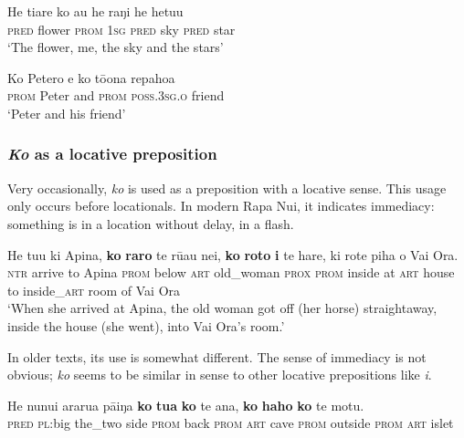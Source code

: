 \ea\label{ex:4.322}
\gll He tiare ko au he raŋi he hetu{\ꞌ}u\\
\textsc{pred} flower \textsc{prom} \textsc{1sg} \textsc{pred} sky \textsc{pred} star\\

\glt 
‘The flower, me, the sky and the stars’ \textstyleExampleref{[R222.000]} 
\z

\ea\label{ex:4.323}
\gll Ko Petero {\ꞌ}e ko tō{\ꞌ}ona repahoa\\
\textsc{prom} Peter and \textsc{prom} \textsc{poss.3sg.o} friend\\

\glt 
‘Peter and his friend’ \textstyleExampleref{[R428.000]} 
\z

\subsubsection{\textit{Ko} as a locative preposition}\label{sec:4.7.11.2}

Very occasionally, \textit{ko} is used as a preposition with a locative sense. This usage only occurs before locationals. In modern Rapa Nui, it indicates immediacy: something is in a location without delay, in a flash.

\ea\label{ex:4.324}
\gll He tu{\ꞌ}u ki {\ꞌ}Apina, \textbf{ko} \textbf{raro} te rū{\ꞌ}au nei, \textbf{ko} \textbf{roto} \textbf{i} te hare, ki rote piha o Vai Ora. \\
\textsc{ntr} arrive to Apina \textsc{prom} below \textsc{art} old\_woman \textsc{prox} \textsc{prom} inside at \textsc{art} house to inside\_\textsc{art} room of Vai Ora \\

\glt
‘When she arrived at Apina, the old woman got off (her horse) straightaway, inside the house (she went), into Vai Ora’s room.’ \textstyleExampleref{[R301.111]} 
\z

In older texts, its use is somewhat different. The sense of immediacy is not obvious; \textit{ko} seems to be similar in sense to other locative prepositions like \textit{{\ꞌ}i}.

\ea\label{ex:4.325}
\gll He nunui ararua pā{\ꞌ}iŋa \textbf{ko} \textbf{tu{\ꞌ}a} \textbf{ko} te {\ꞌ}ana, \textbf{ko} \textbf{haho} \textbf{ko} te motu.\\
\textsc{pred} \textsc{pl}:big the\_two side \textsc{prom} back \textsc{prom} \textsc{art} cave \textsc{prom} outside  \textsc{prom} \textsc{art} islet\\

